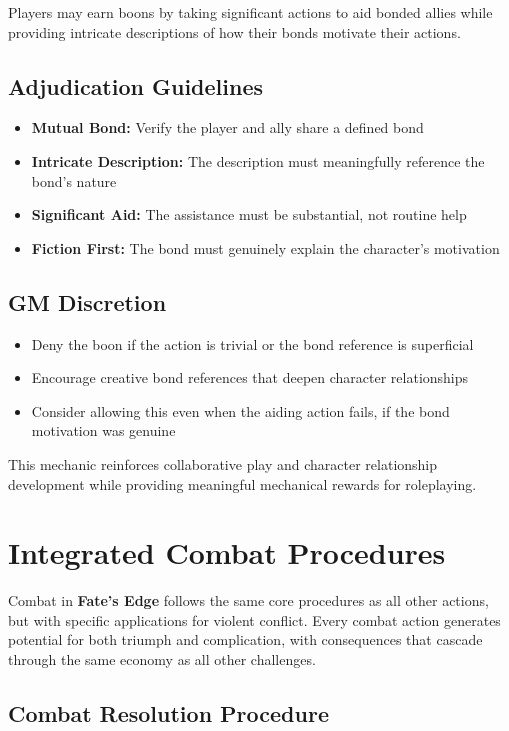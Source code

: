 Players may earn boons by taking significant actions to aid bonded allies while providing intricate descriptions of how their bonds motivate their actions.

\subsection{Adjudication Guidelines}
\begin{itemize}
    \item \textbf{Mutual Bond:} Verify the player and ally share a defined bond
    \item \textbf{Intricate Description:} The description must meaningfully reference the bond's nature
    \item \textbf{Significant Aid:} The assistance must be substantial, not routine help
    \item \textbf{Fiction First:} The bond must genuinely explain the character's motivation
\end{itemize}

\subsection{GM Discretion}
\begin{itemize}
    \item Deny the boon if the action is trivial or the bond reference is superficial
    \item Encourage creative bond references that deepen character relationships
    \item Consider allowing this even when the aiding action fails, if the bond motivation was genuine
\end{itemize}

This mechanic reinforces collaborative play and character relationship development while providing meaningful mechanical rewards for roleplaying.

\section{Integrated Combat Procedures}

Combat in \textbf{Fate's Edge} follows the same core procedures as all other actions, but with specific applications for violent conflict. Every combat action generates potential for both triumph and complication, with consequences that cascade through the same economy as all other challenges.

\subsection{Combat Resolution Procedure}

